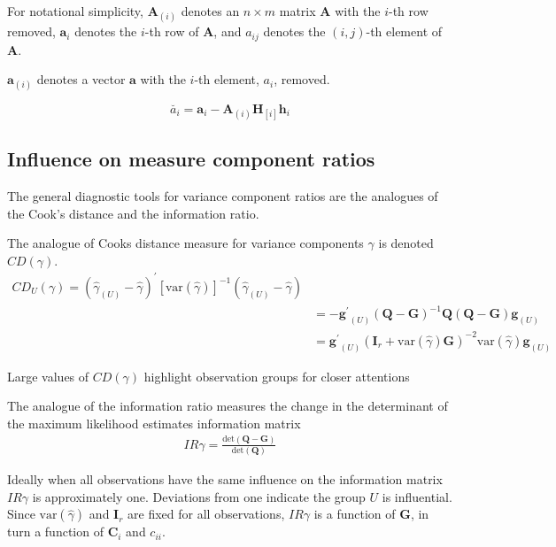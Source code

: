 \documentclass[12pt, a4paper]{report}
\theoremstyle{plain}
\theoremstyle{definition}
\theoremstyle{remark}
\begin{document}
For notational simplicity, $\boldsymbol{A}_{(i)}$ denotes an $n
\times m$ matrix  $\boldsymbol{A}$ with the $i$-th row removed,
$\boldsymbol{a}_{i}$ denotes the $i$-th row of $\boldsymbol{A}$,
and $a_{ij}$ denotes the $(i, j)$-th element of $\boldsymbol{A}$.

$\boldsymbol{a}_{(i)}$ denotes a vector $\boldsymbol{a}$ with the $i$-th element, $a_{i}$, removed.

\begin{equation}
\breve{a_{i}} =  \boldsymbol{a}_{i} -
\boldsymbol{A}_{(i)}\boldsymbol{H}_{[i]}\boldsymbol{h}_{i}
\end{equation}

\subsection{Influence on measure component ratios}               %
The general diagnostic tools for variance component ratios are the analogues of the Cook's distance and the information ratio.

The analogue of Cooks distance measure for variance components $\gamma$ is denoted $CD(\gamma)$.
\begin{eqnarray*}
	CD_{U}(\gamma) = (\hat{\gamma}_{(U)} - \hat{\gamma})^{\prime}[\mbox{var}(\hat{\gamma})]^{-1}(\hat{\gamma}_{(U)} - \hat{\gamma})\\
	&= -\boldsymbol{g^{\prime}}_{(U)} (\boldsymbol{Q}-\boldsymbol{G})^{-1}\boldsymbol{Q}(\boldsymbol{Q}-\boldsymbol{G})\boldsymbol{g}_{(U)} \\
	&= \boldsymbol{g^{\prime}}_{(U)} (\boldsymbol{I}_{r} + \mbox{var}(\hat{\gamma})\boldsymbol{G})^{-2}\mbox{var}(\hat{\gamma})\boldsymbol{g}_{(U)}
\end{eqnarray*}

Large values of $CD(\gamma)$ highlight observation groups for closer attentions

The analogue of the information ratio measures the change in the determinant of the maximum likelihood estimates information matrix
\begin{eqnarray*}
	IR{\gamma}  = \frac{\mbox{det}(\boldsymbol{Q} - \boldsymbol{G})}{\mbox{det}(\boldsymbol{Q})}
\end{eqnarray*}

Ideally when all observations have the same influence on the information matrix $IR{\gamma}$ is approximately one.
Deviations from one indicate the group $U$ is influential. Since $\mbox{var}(\hat{\gamma})$ and $\boldsymbol{I}_{r}$ are fixed for all observations, $IR{\gamma}$ is a function of $\boldsymbol{G}$, in turn a function of $\boldsymbol{C}_{i}$ and $c_{ii}$.
\end{document}

